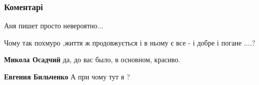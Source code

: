  
 
 
 
 
\subsubsection{Коментарі}

\begin{itemize}
 
Аня пишет просто невероятно...

 
Чому так похмуро ,життя ж продовжується і в ньому є все - і добре і погане ....?

\begin{itemize}
 
\textbf{Микола Осадчий} да, до вас было, в основном, красиво.

 
\textbf{Евгения Бильченко} А при чому тут я ?

 

\end{itemize}
\end{itemize}
